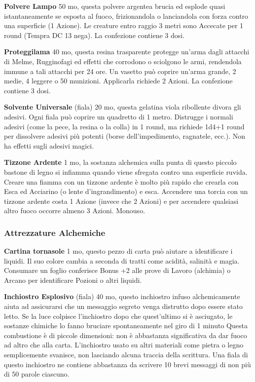 \begin{multicols}{2}
\textbf{Polvere Lampo} 50 mo, questa polvere argentea brucia ed esplode quasi istantaneamente se esposta al fuoco, frizionandola o lanciandola con forza contro una superficie (1 Azione). Le creature entro raggio 3 metri sono Accecate per 1 round (Tempra DC 13 nega). La confezione contiene 3 dosi.

\textbf{Proteggilama} 40 mo, questa resina trasparente protegge un'arma dagli attacchi di Melme, Rugginofagi ed effetti che corrodono o sciolgono le armi, rendendola immune a tali attacchi per 24 ore. Un vasetto può coprire un'arma grande, 2 medie, 4 leggere o 50 munizioni. Applicarla richiede 2 Azioni. La confezione contiene 3 dosi.

\textbf{Solvente Universale} (fiala) 20 mo, questa gelatina viola ribollente divora gli adesivi. Ogni fiala può coprire un quadretto di 1 metro. Distrugge i normali adesivi (come la pece, la resina o la colla) in 1 round, ma richiede 1d4+1 round per dissolvere adesivi più potenti (borse dell'impedimento, ragnatele, ecc.). Non ha effetti sugli adesivi magici.

\textbf{Tizzone Ardente} 1 mo, la sostanza alchemica sulla punta di questo piccolo bastone di legno si infiamma quando viene sfregata contro una superficie ruvida. Creare una fiamma con un tizzone ardente è molto più rapido che crearla con Esca ed Acciarino (o lente d'ingrandimento) e esca. Accendere una torcia con un tizzone ardente costa 1 Azione (invece che 2 Azioni) e per accendere qualsiasi altro fuoco occorre almeno 3 Azioni. Monouso.

\subsubsection{Attrezzature Alchemiche}

\textbf{Cartina tornasole} 1 mo, questo pezzo di carta può aiutare a identificare i liquidi. Il suo colore cambia a seconda di tratti come acidità, salinità e magia. Consumare un foglio conferisce Bonus +2 alle prove di Lavoro (alchimia) o Arcano per identificare Pozioni o altri liquidi.

\textbf{Inchiostro Esplosivo} (fiala) 40 mo, questo inchiostro infuso alchemicamente aiuta ad assicurarsi che un messaggio segreto venga distrutto dopo essere stato letto. Se la luce colpisce l'inchiostro dopo che quest'ultimo si è asciugato, le sostanze chimiche lo fanno bruciare spontaneamente nel giro di 1 minuto
Questa combustione è di piccole dimensioni: non è abbastanza significativa da dar fuoco ad altro che alla carta. L'inchiostro usato su altri materiali come pietra o legno semplicemente svanisce, non lasciando alcuna traccia della scrittura.
Una fiala di questo inchiostro ne contiene abbastanza da scrivere 10 brevi messaggi di non più di 50 parole ciascuno.


\end{multicols}
